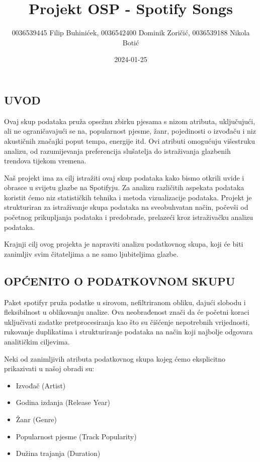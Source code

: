 \documentclass[
]{article}
\title{Projekt OSP - Spotify Songs}
\author{0036539445 Filip Buhinićek, 0036542400 Dominik Zoričić,
0036539188 Nikola Botić}
\date{2024-01-25}
\providecommand{\tightlist}{%
  \setlength{\itemsep}{0pt}\setlength{\parskip}{0pt}}
\begin{document}
\maketitle

\hypertarget{uvod}{%
\subsection{UVOD}\label{uvod}}

Ovaj skup podataka pruža opsežnu zbirku pjesama s nizom atributa,
uključujući, ali ne ograničavajući se na, popularnost pjesme, žanr,
pojedinosti o izvođaču i niz akustičnih značajki poput tempa, energije
itd. Ovi atributi omogućuju višestruku analizu, od razumijevanja
preferencija slušatelja do istraživanja glazbenih trendova tijekom
vremena.

Naš projekt ima za cilj istražiti ovaj skup podataka kako bismo otkrili
uvide i obrasce u svijetu glazbe na Spotifyju. Za analizu različitih
aspekata podataka koristit ćemo niz statističkih tehnika i metoda
vizualizacije podataka. Projekt je strukturiran za istraživanje skupa
podataka na sveobuhvatan način, počevši od početnog prikupljanja
podataka i predobrade, prelazeći kroz istraživačku analizu podataka.

Krajnji cilj ovog projekta je napraviti analizu podatkovnog skupa, koji
će biti zanimljiv svim čitateljima a ne samo ljubiteljima glazbe.

\hypertarget{opux107enito-o-podatkovnom-skupu}{%
\subsection{OPĆENITO O PODATKOVNOM
SKUPU}\label{opux107enito-o-podatkovnom-skupu}}

Paket spotifyr pruža podatke u sirovom, nefiltriranom obliku, dajući
slobodu i fleksibilnost u oblikovanju analize. Ova neobrađenost znači da
će početni koraci uključivati zadatke pretprocesiranja kao što su
čišćenje nepotrebnih vrijednosti, rukovanje duplikatima i strukturiranje
podataka na način koji najbolje odgovara analitičkim ciljevima.

Neki od zanimljivih atributa podatkovnog skupa kojeg ćemo eksplicitno
prikazivati u našoj obradi su:

\begin{itemize}
\tightlist
\item
  Izvođač (Artist)
\item
  Godina izdanja (Release Year)
\item
  Žanr (Genre)
\item
  Popularnost pjesme (Track Popularity)
\item
  Dužina trajanja (Duration)
\end{itemize}
\end{document}
